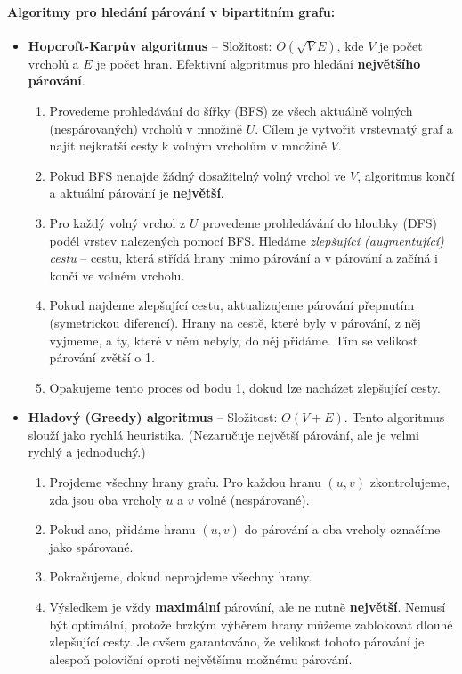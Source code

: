 \paragraph*{Algoritmy pro hledání párování v bipartitním grafu:}
\begin{itemize}
\item \textbf{Hopcroft-Karpův algoritmus} -- Složitost: $O(\sqrt{V} E)$, kde $V$ je počet vrcholů a $E$ je počet hran. Efektivní algoritmus pro hledání \textbf{největšího párování}.
\begin{enumerate}
    \item Provedeme prohledávání do šířky (BFS) ze všech aktuálně volných (nespárovaných) vrcholů v množině $U$. Cílem je vytvořit vrstevnatý graf a najít nejkratší cesty k volným vrcholům v množině $V$.
    \item Pokud BFS nenajde žádný dosažitelný volný vrchol ve $V$, algoritmus končí a aktuální párování je \textbf{největší}.
    \item Pro každý volný vrchol z $U$ provedeme prohledávání do hloubky (DFS) podél vrstev nalezených pomocí BFS. Hledáme \textit{zlepšující (augmentující) cestu} -- cestu, která střídá hrany mimo párování a v párování a začíná i končí ve volném vrcholu.
    \item Pokud najdeme zlepšující cestu, aktualizujeme párování přepnutím (symetrickou diferencí). Hrany na cestě, které byly v párování, z něj vyjmeme, a ty, které v něm nebyly, do něj přidáme. Tím se velikost párování zvětší o 1.
    \item Opakujeme tento proces od bodu 1, dokud lze nacházet zlepšující cesty.
\end{enumerate}

\item \textbf{Hladový (Greedy) algoritmus} -- Složitost: $O(V + E)$. Tento algoritmus slouží jako rychlá heuristika. (Nezaručuje největší párování, ale je velmi rychlý a jednoduchý.)
\begin{enumerate}
    \item Projdeme všechny hrany grafu. Pro každou hranu $(u, v)$ zkontrolujeme, zda jsou oba vrcholy $u$ a $v$ volné (nespárované).
    \item Pokud ano, přidáme hranu $(u, v)$ do párování a oba vrcholy označíme jako spárované.
    \item Pokračujeme, dokud neprojdeme všechny hrany.
    \item Výsledkem je vždy \textbf{maximální} párování, ale ne nutně \textbf{největší}. Nemusí být optimální, protože brzkým výběrem hrany můžeme zablokovat dlouhé zlepšující cesty. Je ovšem garantováno, že velikost tohoto párování je alespoň poloviční oproti největšímu možnému párování.
\end{enumerate}
\end{itemize}

